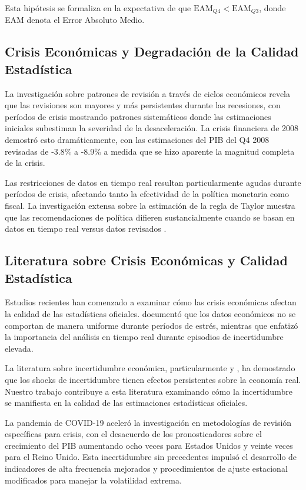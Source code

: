 \documentclass{article}
\begin{document}
Esta hipótesis se formaliza en la expectativa de que $\text{EAM}_{Q4} < \text{EAM}_{Q3}$, donde EAM denota el Error Absoluto Medio.

\subsection{Crisis Económicas y Degradación de la Calidad Estadística}

La investigación sobre patrones de revisión a través de ciclos económicos revela que las revisiones son mayores y más persistentes durante las recesiones, con períodos de crisis mostrando patrones sistemáticos donde las estimaciones iniciales subestiman la severidad de la desaceleración. La crisis financiera de 2008 demostró esto dramáticamente, con las estimaciones del PIB del Q4 2008 revisadas de -3.8\% a -8.9\% a medida que se hizo aparente la magnitud completa de la crisis.

Las restricciones de datos en tiempo real resultan particularmente agudas durante períodos de crisis, afectando tanto la efectividad de la política monetaria como fiscal. La investigación extensa sobre la estimación de la regla de Taylor muestra que las recomendaciones de política difieren sustancialmente cuando se basan en datos en tiempo real versus datos revisados \citep{orphanides2001}.

\subsection{Literatura sobre Crisis Económicas y Calidad Estadística}

Estudios recientes han comenzado a examinar cómo las crisis económicas afectan la calidad de las estadísticas oficiales. \citet{aruoba2008} documentó que los datos económicos no se comportan de manera uniforme durante períodos de estrés, mientras que \citet{croushore2011} enfatizó la importancia del análisis en tiempo real durante episodios de incertidumbre elevada.

La literatura sobre incertidumbre económica, particularmente \citet{bloom2009} y \citet{baker2016}, ha demostrado que los shocks de incertidumbre tienen efectos persistentes sobre la economía real. Nuestro trabajo contribuye a esta literatura examinando cómo la incertidumbre se manifiesta en la calidad de las estimaciones estadísticas oficiales.

La pandemia de COVID-19 aceleró la investigación en metodologías de revisión específicas para crisis, con el desacuerdo de los pronosticadores sobre el crecimiento del PIB aumentando ocho veces para Estados Unidos y veinte veces para el Reino Unido. Esta incertidumbre sin precedentes impulsó el desarrollo de indicadores de alta frecuencia mejorados y procedimientos de ajuste estacional modificados para manejar la volatilidad extrema.
\end{document}
